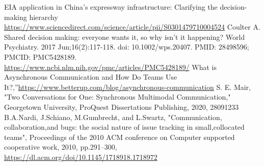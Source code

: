 \documentclass[runningheads]{llncs}
\begin{document}
%
%
%

\begin{thebibliography}{8}
    EIA application in China’s expressway infrastructure: Clarifying the decision-making hierarchy \url{https://www.sciencedirect.com/science/article/pii/S0301479710004524}
    Coulter A. Shared decision making: everyone wants it, so why isn't it happening? World Psychiatry. 2017 Jun;16(2):117-118. doi: 10.1002/wps.20407. PMID: 28498596; PMCID: PMC5428189. \url{https://www.ncbi.nlm.nih.gov/pmc/articles/PMC5428189/} 
    What is Asynchronous Communication and How Do Teams Use It?,”\url{https://www.betterup.com/blog/asynchronous-communication}
    S. E. Mair, "Two Conversations for One: Synchronous Multimodal Communication," Georgetown University, ProQuest Dissertations Publishing, 2020, 28091233
    B.A.Nardi, J.Schiano, M.Gumbrecht, and L.Swartz, "Communication, collaboration,and bugs: the social nature of issue tracking in small,collocated teams", Proceedings of the 2010 ACM conference on Computer supported cooperative work, 2010, pp.291–300, \url{https://dl.acm.org/doi/10.1145/1718918.1718972}
\end{thebibliography}
\end{document}
